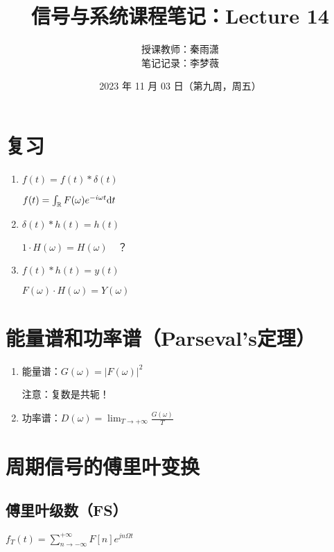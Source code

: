 \documentclass[UTF8]{ctexart}
\begin{document}
\title{信号与系统课程笔记：Lecture 14}
\author{授课教师：秦雨潇 \\
        笔记记录：李梦薇}
\date{2023 年 11 月 03 日（第九周，周五）}
\maketitle

\section{复习}
\begin{enumerate}[label=(\arabic*),itemindent=0pt,labelindent=\parindent,labelwidth=2em,labelsep=5pt,leftmargin=*]
      \item $f(t)=f(t)*\delta(t)$ \par
            $f(t)=\int_{\mathbb{R}}F(\omega)e^{-i\omega{t}}{\rm{d}}t$
      \item $\delta(t)*h(t)=h(t)$ \par
            $1\cdot{H(\omega)}=H(\omega)\quad$？
      \item $f(t)*h(t)=y(t)$ \par
            $F(\omega)\cdot{H(\omega)}=Y(\omega)$
\end{enumerate}\par

\section{能量谱和功率谱（Parseval's定理）}
\begin{enumerate}[label=(\arabic*),itemindent=0pt,labelindent=\parindent,labelwidth=2em,labelsep=5pt,leftmargin=*]
      \item 能量谱：$G(\omega)=|F(\omega)|^2$ \par
            注意：复数是共轭！
      \item 功率谱：$D(\omega)=\lim_{T\to+\infty}\frac{G(\omega)}{T}$ \par
\end{enumerate}\par

\section{周期信号的傅里叶变换}
\subsection{傅里叶级数（FS）}
$f_T(t)=\sum_{n\to-\infty}^{+\infty}F[n]e^{jn\Omega{t}}$ \par
\end{document}
